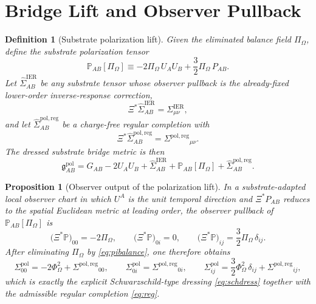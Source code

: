 \documentclass[11pt]{article}
\newcommand{\BridgeMetric}{\mathfrak g}
\newcommand{\SigmaIER}{\Sigma^{\mathrm{IER}}}
\newcommand{\SigmaPol}{\Sigma^{\mathrm{pol}}}
\newcommand{\SigmaRegPol}{\Sigma^{\mathrm{pol,reg}}}
\newcommand{\LiftIER}{\widehat\Sigma^{\mathrm{IER}}}
\newcommand{\LiftRegPol}{\widehat\Sigma^{\mathrm{pol,reg}}}
\newcommand{\PolTen}{\mathbb P}
\newcommand{\ObserverMap}{\Xi}
\newcommand{\ProjSub}{P}
\newcommand{\FlowPot}{\Phi_\Omega}
\newcommand{\BalanceField}{\Pi_\Omega}
\newtheorem{definition}{Definition}
\newtheorem{proposition}{Proposition}
\begin{document}
\section{Bridge Lift and Observer Pullback}

\begin{definition}[Substrate polarization lift]
\label{def:lift}
Given the eliminated balance field \(\BalanceField\), define the \emph{substrate polarization tensor}
\begin{equation}
\PolTen_{AB}[\BalanceField]
\equiv
-2\BalanceField\,U_AU_B
+\frac32\BalanceField\,\ProjSub_{AB}.
\label{eq:poltensor}
\end{equation}
Let \(\LiftIER_{AB}\) be any substrate tensor whose observer pullback is the already-fixed lower-order inverse-response correction,
\begin{equation}
\ObserverMap^*\LiftIER_{AB}=\SigmaIER_{\mu\nu},
\label{eq:liftier}
\end{equation}
and let \(\LiftRegPol_{AB}\) be a charge-free regular completion with
\begin{equation}
\ObserverMap^*\LiftRegPol_{AB}=\SigmaRegPol{}_{\mu\nu}.
\label{eq:liftreg}
\end{equation}
The dressed substrate bridge metric is then
\begin{equation}
\BridgeMetric^{\mathrm{pol}}_{AB}
=
G_{AB}
-2U_AU_B
+\LiftIER_{AB}
+\PolTen_{AB}[\BalanceField]
+\LiftRegPol_{AB}.
\label{eq:bridgepol}
\end{equation}
\end{definition}

\begin{proposition}[Observer output of the polarization lift]
\label{prop:pullback}
In a substrate-adapted local observer chart in which \(U^A\) is the unit temporal direction and \(\ObserverMap^*\ProjSub_{AB}\) reduces to the spatial Euclidean metric at leading order, the observer pullback of \(\PolTen_{AB}[\BalanceField]\) is
\begin{equation}
\bigl(\ObserverMap^*\PolTen\bigr)_{00}=-2\BalanceField,
\qquad
\bigl(\ObserverMap^*\PolTen\bigr)_{0i}=0,
\qquad
\bigl(\ObserverMap^*\PolTen\bigr)_{ij}=\frac32\BalanceField\,\delta_{ij}.
\label{eq:pullbackpol}
\end{equation}
After eliminating \(\BalanceField\) by \eqref{eq:pibalance}, one therefore obtains
\begin{equation}
\SigmaPol_{00}=-2\FlowPot^2+\SigmaRegPol{}_{00},
\qquad
\SigmaPol_{0i}=\SigmaRegPol{}_{0i},
\qquad
\SigmaPol_{ij}=\frac32\FlowPot^2\,\delta_{ij}
+\SigmaRegPol{}_{ij},
\label{eq:observerpol}
\end{equation}
which is exactly the explicit Schwarzschild-type dressing \eqref{eq:schdress} together with the admissible regular completion \eqref{eq:reg}.
\end{proposition}
\end{document}
